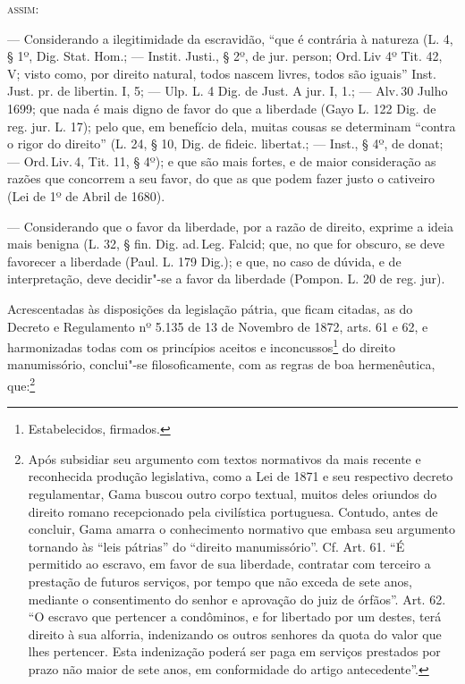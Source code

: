 \textsc{assim}:

--- Considerando a ilegitimidade da escravidão, ``que é contrária à
natureza (L. 4, § 1º, Dig. Stat. Hom.; --- Instit. Justi., § 2º, de jur.
person; Ord.\,Liv 4º Tit. 42, V; visto como, por direito natural, todos
nascem livres, todos são iguais'' Inst. Just. pr. de libertin. I, 5; ---
Ulp. L. 4 Dig. de Just. A jur. I, 1.; --- Alv.\,30 Julho 1699; que nada é
mais digno de favor do que a liberdade (Gayo L. 122 Dig. de reg. jur. L.
17); pelo que, em benefício dela, muitas cousas se determinam ``contra o
rigor do direito'' (L. 24, § 10, Dig. de fideic. libertat.; --- Inst., §
4º, de donat; --- Ord.\,Liv.\,4, Tit. 11, § 4º); e que são mais fortes, e de
maior consideração as razões que concorrem a seu favor, do que as que
podem fazer justo o cativeiro (Lei de 1º de Abril de 1680).

--- Considerando que o favor da liberdade, por a razão de direito,
exprime a ideia mais benigna (L. 32, § fin. Dig. ad.\,Leg. Falcid; que,
no que for obscuro, se deve favorecer a liberdade (Paul. L. 179 Dig.); e
que, no caso de dúvida, e de interpretação, deve decidir"-se a favor da
liberdade (Pompon. L. 20 de reg. jur).

Acrescentadas às disposições da legislação pátria, que ficam citadas, as
do Decreto e Regulamento nº 5.135 de 13 de Novembro de 1872, arts. 61 e
62, e harmonizadas todas com os princípios aceitos e
inconcussos\footnote{Estabelecidos, firmados.} do direito
manumissório, conclui"-se filosoficamente, com as regras de boa
hermenêutica, que:\footnote{Após subsidiar seu argumento com textos
  normativos da mais recente e reconhecida produção legislativa, como a
  Lei de 1871 e seu respectivo decreto regulamentar, Gama buscou outro
  corpo textual, muitos deles oriundos do direito romano recepcionado
  pela civilística portuguesa. Contudo, antes de concluir, Gama amarra o
  conhecimento normativo que embasa seu argumento tornando às ``leis
  pátrias'' do ``direito manumissório''. Cf. Art. 61. ``É permitido ao
  escravo, em favor de sua liberdade, contratar com terceiro a prestação
  de futuros serviços, por tempo que não exceda de sete anos, mediante o
  consentimento do senhor e aprovação do juiz de órfãos''. Art. 62. ``O
  escravo que pertencer a condôminos, e for libertado por um destes,
  terá direito à sua alforria, indenizando os outros senhores da quota
  do valor que lhes pertencer. Esta indenização poderá ser paga em
  serviços prestados por prazo não maior de sete anos, em conformidade
  do artigo antecedente''.}

